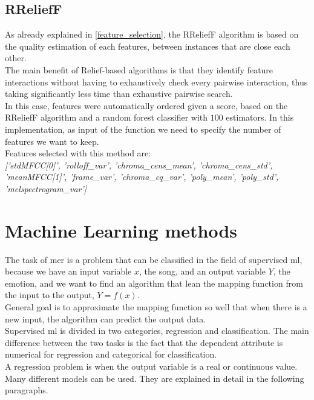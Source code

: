 \subsection{RReliefF}
As already explained in \ref{feature_selection}, the RReliefF algorithm is based on the quality estimation of each features, between instances that are close each other.
\\
The main benefit of Relief-based algorithms is that they identify feature interactions without having to exhaustively check every pairwise interaction, thus taking significantly less time than exhaustive pairwise search.
\\
In this case, features were automatically ordered given a score, based on the RReliefF algorithm and a random forest classifier with $100$ estimators. In this implementation, as input of the function we need to specify the number of features we want to keep.
\\
Features selected with this method are:
\\ \linebreak 
\textit{['stdMFCC[0]',	 'rolloff\_var', 'chroma\_cens\_mean', 'chroma\_cens\_std', 'meanMFCC[1]', 'frame\_var', 'chroma\_cq\_var', 'poly\_mean', 'poly\_std', 'melspectrogram\_var']}

\section{Machine Learning methods}
The task of \gls{mer} is a problem that can be classified in the field of supervised \gls{ml}, because we have an input variable $x$, the song, and an output variable $Y$, the emotion, and we want to find an algorithm that lean the mapping function from the input to the output, $Y=f(x)$.
\\ \indent
General goal is to approximate the mapping function so well that when there is a new input, the algorithm can predict the output data.
\\
Supervised \gls{ml} is divided in two categories, regression and classification. The main difference between the two tasks is the fact that the dependent attribute is numerical for regression and categorical for classification.
\\ \indent
A regression problem is when the output variable is a real or continuous value. Many different models can be used. They are explained in detail in the following paragraphs.

